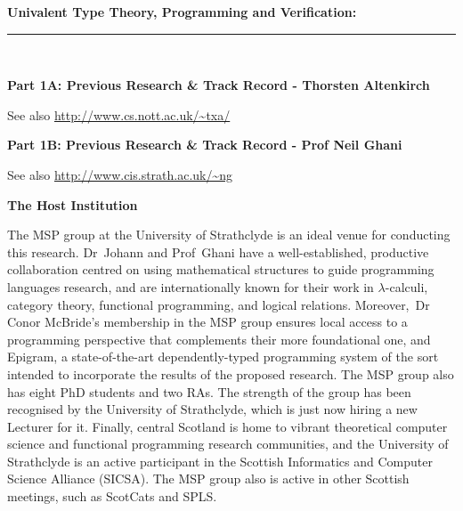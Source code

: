 \documentclass[a4paper,11pt]{article}
\begin{document}
\thispagestyle{plain}
\begin{center}
  {\Large {\bf Univalent Type Theory, Programming and Verification:}}\\[1ex] 

\vspace*{-0.1in}

  \rule{140mm}{.5mm}\\[2ex]
\end{center}

\noindent
{\bf \Large Part 1A: Previous Research \& Track Record - 
Thorsten Altenkirch}

\vspace{0.05in}


\noindent
See also \url{http://www.cs.nott.ac.uk/~txa/}

\vspace{0.05in}

\noindent

\pagebreak

\noindent
{\bf \Large Part 1B: Previous Research \& Track Record -
Prof Neil Ghani}

\vspace{0.05in}

\noindent
See also \url{http://www.cis.strath.ac.uk/~ng}

\noindent
{\bf \Large The Host Institution} 

\vspace*{0.05in}

\noindent
The MSP group at the University of Strathclyde is an ideal venue for
conducting this research. Dr~Johann and Prof~Ghani have a
well-established, productive collaboration centred on using
mathematical structures to guide programming languages research, and
are internationally known for their work in $\lambda$-calculi,
category theory, functional programming, and logical
relations. Moreover,~Dr Conor McBride's membership in the MSP group
ensures local access to a programming perspective that
complements their more foundational one, and Epigram, a state-of-the-art
dependently-typed programming system of the sort intended to
incorporate the results of the proposed research. The MSP group also has
eight PhD students and two RAs.  The strength of the group has
been recognised by the University of Strathclyde, which is just now
hiring a new Lecturer for it.  Finally, central Scotland is home to
vibrant theoretical computer science and functional programming
research communities, and the University of Strathclyde is an active
participant in the Scottish Informatics and Computer Science Alliance
(SICSA). The MSP group also is active in other Scottish meetings, such
as ScotCats and SPLS.
\end{document}
